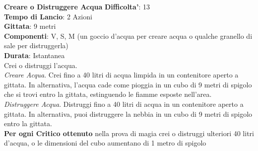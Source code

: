 \begin{multicols}{2}
\medskip\textbf{Creare o Distruggere Acqua}
\textbf{Difficolta'}: 13\\
\textbf{Tempo di Lancio}: 2 Azioni\\
\textbf{Gittata}: 9 metri\\
\textbf{Componenti}: V, S, M (un goccio d’acqua per creare acqua o qualche granello di sale per distruggerla)\\
\textbf{Durata}: Istantanea\\
Crei o distruggi l’acqua.\\
\textit{Creare Acqua}. Crei fino a 40 litri di acqua limpida in un contenitore aperto a gittata. In alternativa, l’acqua cade come pioggia in un cubo di 9 metri di spigolo che si trovi entro la gittata, estinguendo le fiamme esposte nell’area.\\
\textit{Distruggere Acqua}. Distruggi fino a 40 litri di acqua in un contenitore aperto a gittata. In alternativa, puoi distruggere la nebbia in un cubo di 9 metri di spigolo entro la gittata.\\
\textbf{Per ogni Critico ottenuto} nella prova di magia crei o distruggi ulteriori 40 litri d’acqua, o le dimensioni del cubo aumentano di 1 metro di spigolo


\end{multicols}
